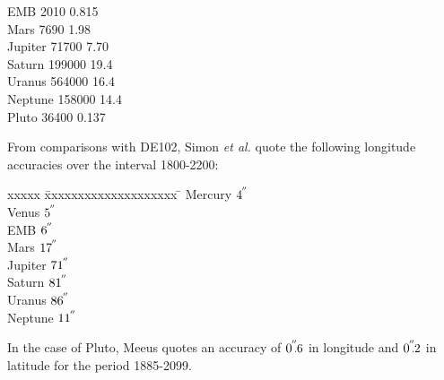 \documentclass[11pt,twoside]{article}
\newcommand{\arcsec}[2] {\arcseci{#1}$\hspace{-0.4em}.#2$}
\newcommand{\arcsec}[2] {
      {$#1\hspace{-0.05em}^{'\hspace{-0.1em}'}\hspace{-0.4em}.#2$}
   }
\newcommand{\arcseci}[1] {$#1\hspace{-0.05em}$\raisebox{-0.5ex}
                         {$^{'\hspace{-0.1em}'}$}}
\renewcommand{\arcseci}[1] {$#1\hspace{-0.05em}^{'\hspace{-0.1em}'}$}
\begin{document}
{\begin{enumerate}
\begin{tabbing}
         \> EMB     \> \hspace{1.5em}2010 \> \hspace{2.5em}0.815 \\
         \> Mars    \> \hspace{1.5em}7690 \> \hspace{2.5em}1.98 \\
         \> Jupiter \> \hspace{1em}71700 \> \hspace{2.5em}7.70 \\
         \> Saturn  \> \hspace{0.5em}199000 \> \hspace{2em}19.4 \\
         \> Uranus  \> \hspace{0.5em}564000 \> \hspace{2em}16.4 \\
         \> Neptune \> \hspace{0.5em}158000 \> \hspace{2em}14.4 \\
         \> Pluto \> \hspace{1em}36400 \> \hspace{2.5em}0.137
        \end{tabbing}
        From comparisons with DE102, Simon {\it et al.}\/ quote the following
        longitude accuracies over the interval 1800-2200:
        \begin{tabbing}
         xxxxx \= xxxxxxxxxxxxxxxxxxxx \= \kill
         \> Mercury \> \hspace{0.5em}\arcseci{4} \\
         \> Venus   \> \hspace{0.5em}\arcseci{5} \\
         \> EMB     \> \hspace{0.5em}\arcseci{6} \\
         \> Mars    \> \arcseci{17} \\
         \> Jupiter \> \arcseci{71} \\
         \> Saturn  \> \arcseci{81} \\
         \> Uranus  \> \arcseci{86} \\
         \> Neptune \> \arcseci{11}
        \end{tabbing}
        In the case of Pluto, Meeus quotes an accuracy of \arcsec{0}{6}
        in longitude and \arcsec{0}{2} in latitude for the period
        1885-2099.


\end{enumerate}}
\end{document}
